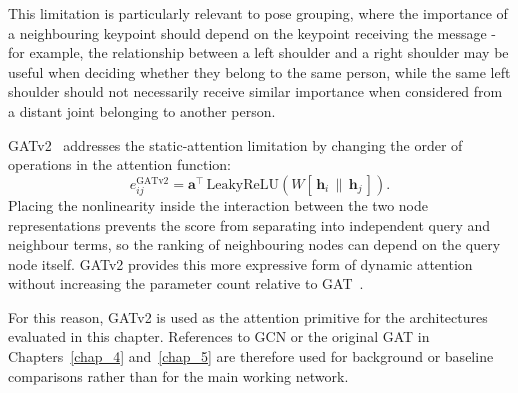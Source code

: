 This limitation is particularly relevant to pose grouping,
where the importance of a neighbouring keypoint should depend on the keypoint receiving the message -
for example,
the relationship between a left shoulder and a right shoulder
may be useful when deciding whether they belong to the same person,
while the same left shoulder should not necessarily receive similar importance
when considered from a distant joint belonging to another person.

GATv2~\cite{brody2022gatv2} addresses the static-attention limitation
by changing the order of operations in the attention function:
\begin{equation}
    e_{ij}^{\mathrm{GATv2}} =
    \mathbf{a}^{\top}\,
    \mathrm{LeakyReLU}\!\left(
        W\left[\,\mathbf{h}_i \,\|\, \mathbf{h}_j\,\right]
    \right).
    \label{eq:gatv2_attn}
\end{equation}
Placing the nonlinearity inside the interaction between the two node representations
prevents the score from separating into independent query and neighbour terms,
so the ranking of neighbouring nodes can depend on the query node itself.
GATv2 provides this more expressive form of dynamic attention
without increasing the parameter count relative to GAT~\cite{brody2022gatv2}.

For this reason,
GATv2 is used as the attention primitive for the architectures evaluated in this chapter.
References to GCN or the original GAT in Chapters~\ref{chap_4} and~\ref{chap_5}
are therefore used for background or baseline comparisons rather than for the main working network.